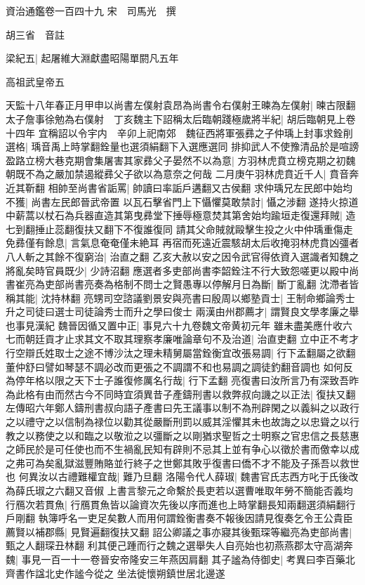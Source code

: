 資治通鑑卷一百四十九
宋　司馬光　撰

胡三省　音註

梁紀五|{
	起屠維大淵獻盡昭陽單閼凡五年}


高祖武皇帝五

天監十八年春正月甲申以尚書左僕射袁昂為尚書令右僕射王暕為左僕射|{
	暕古限翻}
太子詹事徐勉為右僕射　丁亥魏主下詔稱太后臨朝踐極歲將半紀|{
	胡后臨朝見上卷十四年}
宜稱詔以令宇内　辛卯上祀南郊　魏征西將軍張彞之子仲瑀上封事求銓削選格|{
	瑀音禹上時掌翻銓量也選須絹翻下入選應選同}
排抑武人不使豫清品於是喧謗盈路立榜大巷克期會集屠害其家彞父子晏然不以為意|{
	方羽林虎賁立榜克期之初魏朝既不為之嚴加禁遏縱彞父子欲以為意奈之何哉}
二月庚午羽林虎賁近千人|{
	賁音奔近其靳翻}
相帥至尚書省詬罵|{
	帥讀曰率詬戶遘翻又古侯翻}
求仲瑀兄左民郎中始均不獲|{
	尚書左民郎晉武帝置}
以瓦石擊省門上下懾懼莫敢禁討|{
	懾之涉翻}
遂持火掠道中薪蒿以杖石為兵器直造其第曳彞堂下捶辱極意焚其第舍始均踰垣走復還拜賊|{
	造七到翻捶止蕊翻復扶又翻下不復誰復同}
請其父命賊就毆擊生投之火中仲瑀重傷走免彞僅有餘息|{
	言氣息奄奄僅未絶耳}
再宿而死遠近震駭胡太后收掩羽林虎賁凶彊者八人斬之其餘不復窮治|{
	治直之翻}
乙亥大赦以安之因令武官得依資入選識者知魏之將亂矣時官員既少|{
	少詩沼翻}
應選者多吏部尚書李韶銓注不行大致怨嗟更以殿中尚書崔亮為吏部尚書亮奏為格制不問士之賢愚專以停解月日為斷|{
	斷丁亂翻}
沈滯者皆稱其能|{
	沈持林翻}
亮甥司空諮議劉景安與亮書曰殷周以鄉塾貢士|{
	王制命鄉論秀士升之司徒曰選士司徒論秀士而升之學曰俊士}
兩漢由州郡薦才|{
	謂賢良文學孝廉之舉也事見漢紀}
魏晉因循又置中正|{
	事見六十九卷魏文帝黄初元年}
雖未盡美應什收六七而朝廷貢才止求其文不取其理察孝廉唯論章句不及治道|{
	治直吏翻}
立中正不考才行空辯氏姓取士之途不博沙汰之理未精舅屬當銓衡宜改張易調|{
	行下孟翻屬之欲翻董仲舒曰譬如琴瑟不調必改而更張之不調謂不和也易調之調徒釣翻音調也}
如何反為停年格以限之天下士子誰復修厲名行哉|{
	行下孟翻}
亮復書曰汝所言乃有深致吾昨為此格有由而然古今不同時宜須異昔子產鑄刑書以救弊叔向譏之以正法|{
	復扶又翻左傳昭六年鄭人鑄刑書叔向語子產書曰先王議事以制不為刑辟閑之以義糾之以政行之以禮守之以信制為禄位以勸其從嚴斷刑罰以威其淫懼其未也故誨之以忠聳之以行教之以務使之以和臨之以敬涖之以彊斷之以剛猶求聖哲之士明察之官忠信之長慈惠之師民於是可任使也而不生禍亂民知有辟則不忌其上並有争心以徵於書而儌幸以成之弗可為矣亂獄滋豐賄賂並行終子之世鄭其敗乎復書曰僑不才不能及子孫吾以救世也}
何異汝以古禮難權宜哉|{
	難乃旦翻}
洛陽令代人薛琡|{
	魏書官氏志西方叱于氏後改為薛氏琡之六翻又音俶}
上書言黎元之命繫於長吏若以選曹唯取年勞不簡能否義均行鴈次若貫魚|{
	行鴈貫魚皆以論資次先後以序而進也上時掌翻長知兩翻選須絹翻行戶剛翻}
執簿呼名一吏足矣數人而用何謂銓衡書奏不報後因請見復奏乞令王公貴臣薦賢以補郡縣|{
	見賢遍翻復扶又翻}
詔公卿議之事亦寢其後甄琛等繼亮為吏部尚書|{
	甄之人翻琛丑林翻}
利其便己踵而行之魏之選舉失人自亮始也初燕燕郡太守高湖奔魏|{
	事見一百一十一卷晉安帝隆安三年燕因肩翻}
其子謐為侍御史|{
	考異曰李百藥北齊書作諡北史作謐今從之}
坐法徙懷朔鎮世居北邊遂

